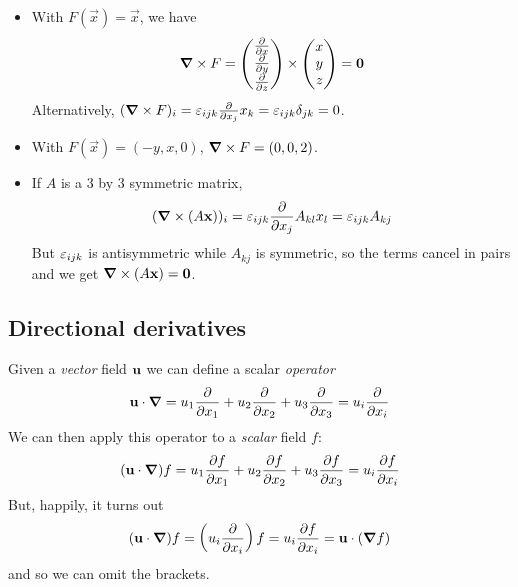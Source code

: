 \documentclass{../../template/note}
\begin{document}
    \begin{example*}
        \begin{itemize}
            \item With \(F(\vec x) = \vec x\), we have
            \begin{align*}
                \curl F = \begin{pmatrix}
                 \pd{}{x} \\
                 \pd{}{y} \\
                 \pd{}{z} \\
                \end{pmatrix} \times \begin{pmatrix}
                 x \\
                 y \\
                 z \\
                \end{pmatrix} = \vec 0
            \end{align*}
            Alternatively, \((\curl F)_i = \lv{ijk} \pd{}{x_j} x_k = \lv{ijk}\delta_{jk} = 0\).
            \item With \(F(\vec x) = (-y, x, 0)\), \(\curl F = (0, 0, 2)\).
            \item If \(A\) is a 3 by 3 symmetric matrix,
            \begin{align*}
                (\curl (A \vec x))_i = \lv{ijk} \pd{}{x_j} A_{kl}x_l = \lv{ijk} A_{kj}
            \end{align*}
            But \(\varepsilon_{ijk}\) is antisymmetric while \(A_{kj}\) is symmetric, so the terms cancel in pairs and we get \(\curl (A \vec x) = \vec 0\).
        \end{itemize}
    \end{example*}
    
    \subsection{Directional derivatives}

    Given a \emph{vector} field \(\V u\) we can define a scalar \emph{operator}
    \begin{align*}
        \V u \cdot \grad = u_1 \pd{}{x_1} + u_2 \pd{}{x_2} + u_3 \pd{}{x_3} = u_i \pd{}{x_i}
    \end{align*}
    We can then apply this operator to a \emph{scalar} field \(f\):
    \begin{align*}
        (\V u \cdot \grad)f = u_1 \pd{f}{x_1} + u_2 \pd{f}{x_2} + u_3 \pd{f}{x_3} = u_i \pd{f}{x_i}
    \end{align*}
    But, happily, it turns out
    \begin{align*}
        (\V u \cdot \grad)f = \left(u_i \pd{}{x_i}\right)f = u_i \pd{f}{x_i} = \V u \cdot (\grad f)
    \end{align*}
    and so we can omit the brackets.
    
\end{document}
